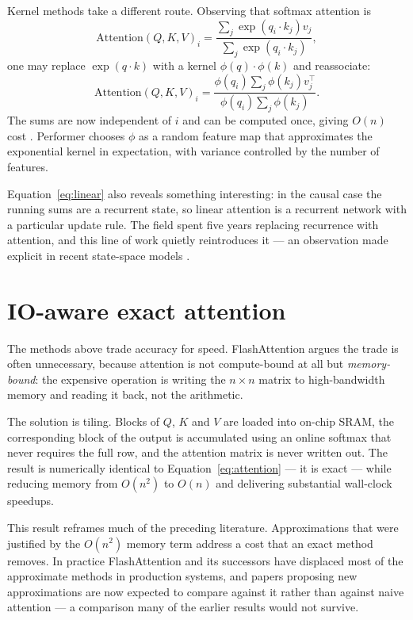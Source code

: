 \documentclass[11pt,a4paper]{article}
\begin{document}
Kernel methods take a different route. Observing that softmax attention is
\begin{equation}
  \mathrm{Attention}(Q,K,V)_i
    = \frac{\sum_j \exp(q_i \cdot k_j) v_j}{\sum_j \exp(q_i \cdot k_j)},
\end{equation}
one may replace $\exp(q \cdot k)$ with a kernel $\phi(q) \cdot \phi(k)$ and
reassociate:
\begin{equation}
  \mathrm{Attention}(Q,K,V)_i
    = \frac{\phi(q_i) \sum_j \phi(k_j) v_j^{\top}}
           {\phi(q_i) \sum_j \phi(k_j)}.
  \label{eq:linear}
\end{equation}
The sums are now independent of $i$ and can be computed once, giving $O(n)$
cost \cite{katharopoulos2020}. Performer \cite{choromanski2021} chooses $\phi$
as a random feature map that approximates the exponential kernel in
expectation, with variance controlled by the number of features.

Equation~\ref{eq:linear} also reveals something interesting: in the causal
case the running sums are a recurrent state, so linear attention is a
recurrent network with a particular update rule. The field spent five years
replacing recurrence with attention, and this line of work quietly reintroduces
it --- an observation made explicit in recent state-space models
\cite{gu2023}.

\section{IO-aware exact attention}
\label{sec:io}

The methods above trade accuracy for speed. FlashAttention \cite{dao2022}
argues the trade is often unnecessary, because attention is not
compute-bound at all but \emph{memory-bound}: the expensive operation is
writing the $n \times n$ matrix to high-bandwidth memory and reading it back,
not the arithmetic.

The solution is tiling. Blocks of $Q$, $K$ and $V$ are loaded into on-chip
SRAM, the corresponding block of the output is accumulated using an online
softmax that never requires the full row, and the attention matrix is never
written out. The result is numerically identical to
Equation~\ref{eq:attention} --- it is exact --- while reducing memory from
$O(n^2)$ to $O(n)$ and delivering substantial wall-clock speedups.

This result reframes much of the preceding literature. Approximations that
were justified by the $O(n^2)$ memory term address a cost that an exact method
removes. In practice FlashAttention and its successors have displaced most of
the approximate methods in production systems, and papers proposing new
approximations are now expected to compare against it rather than against
naive attention --- a comparison many of the earlier results would not survive.
\end{document}
